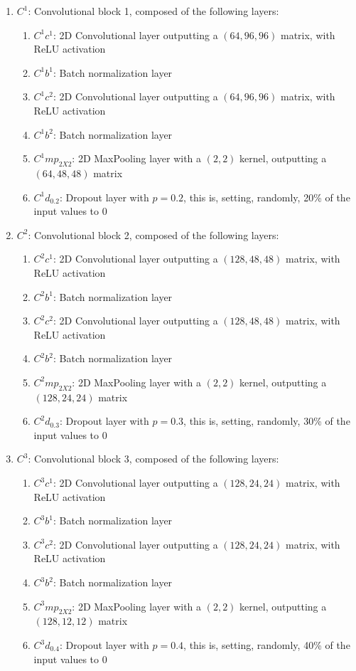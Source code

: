 \documentclass[conference]{IEEEtran}
\begin{document}
\begin{enumerate}
    \item $C^1$: Convolutional block 1, composed of the following layers:
    \begin{enumerate}
        \item $C^1 c^1$: 2D Convolutional layer outputting a $(64,96,96)$ matrix, with ReLU activation
        \item $C^1 b^1$: Batch normalization layer
        \item $C^1 c^2$: 2D Convolutional layer outputting a $(64,96,96)$ matrix, with ReLU activation
        \item $C^1 b^2$: Batch normalization layer
        \item $C^1 mp_{2X2}$: 2D MaxPooling layer with a $(2, 2)$ kernel, outputting a $(64, 48, 48)$ matrix
        \item $C^1 d_{0.2}$: Dropout layer with $p=0.2$, this is, setting, randomly, 20\% of the input values to 0
    \end{enumerate}
    
    \item $C^2$: Convolutional block 2, composed of the following layers:
    \begin{enumerate}
        \item $C^2 c^1$: 2D Convolutional layer outputting a $(128,48,48)$ matrix, with ReLU activation
        \item $C^2 b^1$: Batch normalization layer
        \item $C^2 c^2$: 2D Convolutional layer outputting a $(128,48,48)$ matrix, with ReLU activation
        \item $C^2 b^2$: Batch normalization layer
        \item $C^2 mp_{2X2}$: 2D MaxPooling layer with a $(2, 2)$ kernel, outputting a $(128, 24, 24)$ matrix
        \item $C^2 d_{0.3}$: Dropout layer with $p=0.3$, this is, setting, randomly, 30\% of the input values to 0
    \end{enumerate}
    
    \item $C^3$: Convolutional block 3, composed of the following layers:
    \begin{enumerate}
        \item $C^3 c^1$: 2D Convolutional layer outputting a $(128,24,24)$ matrix, with ReLU activation
        \item $C^3 b^1$: Batch normalization layer
        \item $C^3 c^2$: 2D Convolutional layer outputting a $(128,24,24)$ matrix, with ReLU activation
        \item $C^3 b^2$: Batch normalization layer
        \item $C^3 mp_{2X2}$: 2D MaxPooling layer with a $(2, 2)$ kernel, outputting a $(128, 12, 12)$ matrix
        \item $C^3 d_{0.4}$: Dropout layer with $p=0.4$, this is, setting, randomly, 40\% of the input values to 0
    \end{enumerate}
    

\end{enumerate}
\end{document}
